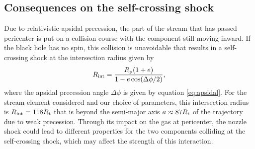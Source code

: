 \documentclass[a4paper,fleqn,usenatbib]{mnras}
\newcommand{\be}{\begin{equation}}
\newcommand{\ee}{\end{equation}}
\newcommand{\rt}{R_{\rm t}}
\begin{document}
\subsection{Consequences on the self-crossing shock}
\label{sec:crossing}


Due to relativistic apsidal precession, the part of the stream that has passed pericenter is put on a collision course with the component still moving inward. If the black hole has no spin, this collision is unavoidable that results in a self-crossing shock at the intersection radius given by \citep{dai2015}
\be
R_{\rm int} = \frac{R_{\rm p} (1+e)}{1-e \cos(\Delta \phi/2)},
\label{eq:rint}
\ee
where the apsidal precession angle $\Delta \phi$ is given by equation \eqref{eq:apsidal}. For the stream element considered and our choice of parameters, this intersection radius is $R_{\rm int} = 118 \rt$ that is beyond the semi-major axis $a \approx 87 \rt$ of the trajectory due to weak precession. Through its impact on the gas at pericenter, the nozzle shock could lead to different properties for the two components colliding at the self-crossing shock, which may affect the strength of this interaction.
\end{document}
